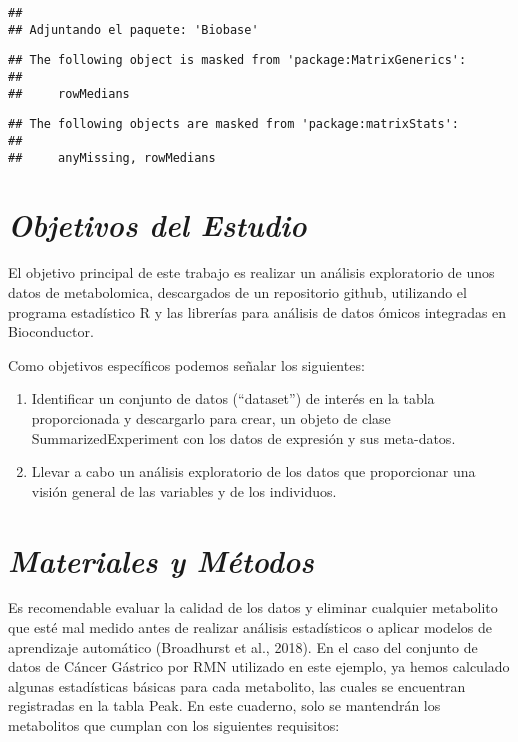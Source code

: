 \documentclass[
]{article}
\begin{document}
\begin{verbatim}
## 
## Adjuntando el paquete: 'Biobase'
\end{verbatim}

\begin{verbatim}
## The following object is masked from 'package:MatrixGenerics':
## 
##     rowMedians
\end{verbatim}

\begin{verbatim}
## The following objects are masked from 'package:matrixStats':
## 
##     anyMissing, rowMedians
\end{verbatim}

\section{\texorpdfstring{\emph{Objetivos del
Estudio}}{Objetivos del Estudio}}\label{objetivos-del-estudio}

El objetivo principal de este trabajo es realizar un análisis
exploratorio de unos datos de metabolomica, descargados de un
repositorio github, utilizando el programa estadístico R y las librerías
para análisis de datos ómicos integradas en Bioconductor.

Como objetivos específicos podemos señalar los siguientes:

\begin{enumerate}
\def\labelenumi{\arabic{enumi}.}
\item
  Identificar un conjunto de datos (``dataset'') de interés en la tabla
  proporcionada y descargarlo para crear, un objeto de clase
  SummarizedExperiment con los datos de expresión y sus meta-datos.
\item
  Llevar a cabo un análisis exploratorio de los datos que proporcionar
  una visión general de las variables y de los individuos.
\end{enumerate}

\section{\texorpdfstring{\emph{Materiales y
Métodos}}{Materiales y Métodos}}\label{materiales-y-muxe9todos}

Es recomendable evaluar la calidad de los datos y eliminar cualquier
metabolito que esté mal medido antes de realizar análisis estadísticos o
aplicar modelos de aprendizaje automático (Broadhurst et al., 2018). En
el caso del conjunto de datos de Cáncer Gástrico por RMN utilizado en
este ejemplo, ya hemos calculado algunas estadísticas básicas para cada
metabolito, las cuales se encuentran registradas en la tabla Peak. En
este cuaderno, solo se mantendrán los metabolitos que cumplan con los
siguientes requisitos:
\end{document}
